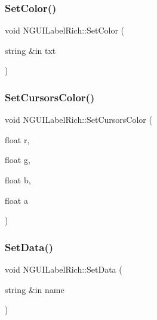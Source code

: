 \subsubsection{\texorpdfstring{Set\+Color()}{SetColor()}\hspace{0.1cm}{\footnotesize\ttfamily [2/2]}}
{\footnotesize\ttfamily void N\+G\+U\+I\+Label\+Rich\+::\+Set\+Color (\begin{DoxyParamCaption}\item[{string \&in}]{txt }\end{DoxyParamCaption})}

\hypertarget{class_n_g_u_i_label_rich_ab4b1a1a45b71236ad72cda05b0b40e95}{}\label{class_n_g_u_i_label_rich_ab4b1a1a45b71236ad72cda05b0b40e95} 
\subsubsection{\texorpdfstring{Set\+Cursors\+Color()}{SetCursorsColor()}}
{\footnotesize\ttfamily void N\+G\+U\+I\+Label\+Rich\+::\+Set\+Cursors\+Color (\begin{DoxyParamCaption}\item[{float}]{r,  }\item[{float}]{g,  }\item[{float}]{b,  }\item[{float}]{a }\end{DoxyParamCaption})}

\hypertarget{class_n_g_u_i_label_rich_af89bfd591e9a6f1f0dedaa21759803a2}{}\label{class_n_g_u_i_label_rich_af89bfd591e9a6f1f0dedaa21759803a2} 
\subsubsection{\texorpdfstring{Set\+Data()}{SetData()}}
{\footnotesize\ttfamily void N\+G\+U\+I\+Label\+Rich\+::\+Set\+Data (\begin{DoxyParamCaption}\item[{string \&in}]{name }\end{DoxyParamCaption})}

\hypertarget{class_n_g_u_i_label_rich_af49550633b4f260f94ad1591d9e7f48e}{}\label{class_n_g_u_i_label_rich_af49550633b4f260f94ad1591d9e7f48e} 
